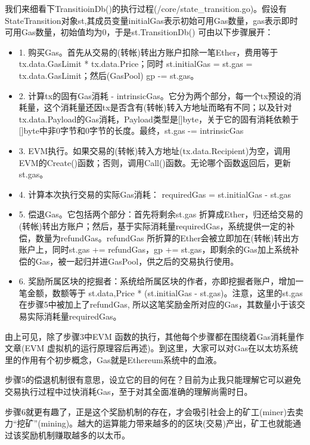 \documentclass[UTF8]{ctexart}
\begin{document}
我们来细看下TransitioinDb()的执行过程(/core/state\_transition.go)。假设有StateTransition对象st,其成员变量initialGas表示初始可用Gas数量，gas表示即时可用Gas数量，初始值均为0，于是st.TransitionDb() 可由以下步骤展开：

\begin{itemize}
	\item 1. 购买Gas。首先从交易的(转帐)转出方账户扣除一笔Ether，费用等于tx.data.GasLimit * tx.data.Price；同时 st.initialGas = st.gas = tx.data.GasLimit；然后(GasPool) gp -= st.gas。

	\item 2. 计算tx的固有Gas消耗 - intrinsicGas。它分为两个部分，每一个tx预设的消耗量，这个消耗量还因tx是否含有(转帐)转入方地址而略有不同；以及针对tx.data.Payload的Gas消耗，Payload类型是[]byte，关于它的固有消耗依赖于[]byte中非0字节和0字节的长度。最终，st.gas -= intrinsicGas

	\item 3. EVM执行。如果交易的(转帐)转入方地址(tx.data.Recipient)为空，调用EVM的Create()函数；否则，调用Call()函数。无论哪个函数返回后，更新st.gas。

	\item 4. 计算本次执行交易的实际Gas消耗： requiredGas = st.initialGas - st.gas

	\item 5. 偿退Gas。它包括两个部分：首先将剩余st.gas 折算成Ether，归还给交易的(转帐)转出方账户；然后，基于实际消耗量requiredGas，系统提供一定的补偿，数量为refundGas。refundGas 所折算的Ether会被立即加在(转帐)转出方账户上，同时st.gas += refundGas，gp += st.gas，即剩余的Gas加上系统补偿的Gas，被一起归并进GasPool，供之后的交易执行使用。

	\item 6. 奖励所属区块的挖掘者：系统给所属区块的作者，亦即挖掘者账户，增加一笔金额，数额等于 st.data,Price * (st.initialGas - st.gas)。注意，这里的st.gas在步骤5中被加上了refundGas, 所以这笔奖励金所对应的Gas，其数量小于该交易实际消耗量requiredGas。
\end{itemize}
由上可见，除了步骤3中EVM 函数的执行，其他每个步骤都在围绕着Gas消耗量作文章(EVM 虚拟机的运行原理容后再述)。到这里，大家可以对Gas在以太坊系统里的作用有个初步概念，Gas就是Ethereum系统中的血液。

步骤5的偿退机制很有意思，设立它的目的何在？目前为止我只能理解它可以避免交易执行过程中过快消耗Gas，至于对其全面准确的理解尚需时日。

步骤6就更有趣了，正是这个奖励机制的存在，才会吸引社会上的矿工(miner)去卖力“挖矿”(mining)。越大的运算能力带来越多的的区块(交易)产出，矿工也就能通过该奖励机制赚取越多的以太币。
\end{document}
